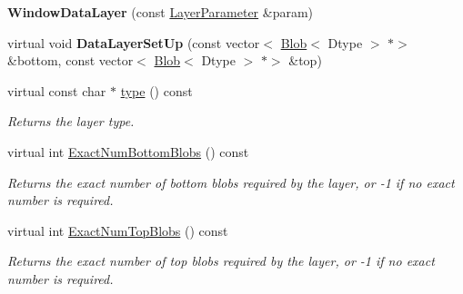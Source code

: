 \begin{DoxyCompactItemize}
{\bfseries Window\+Data\+Layer} (const \mbox{\hyperlink{classcaffe_1_1_layer_parameter}{Layer\+Parameter}} \&param)
\item 
\mbox{\label{classcaffe_1_1_window_data_layer_a217f2006728530d6c53d273c6ea0c0c0}} 
virtual void {\bfseries Data\+Layer\+Set\+Up} (const vector$<$ \mbox{\hyperlink{classcaffe_1_1_blob}{Blob}}$<$ Dtype $>$ $\ast$$>$ \&bottom, const vector$<$ \mbox{\hyperlink{classcaffe_1_1_blob}{Blob}}$<$ Dtype $>$ $\ast$$>$ \&top)
\item 
\mbox{\label{classcaffe_1_1_window_data_layer_abbe9d7bd1141bf0492eeca4bb1d7b7c3}} 
virtual const char $\ast$ \mbox{\hyperlink{classcaffe_1_1_window_data_layer_abbe9d7bd1141bf0492eeca4bb1d7b7c3}{type}} () const
\begin{DoxyCompactList}\small\item\em Returns the layer type. \end{DoxyCompactList}\item 
virtual int \mbox{\hyperlink{classcaffe_1_1_window_data_layer_ac982c8170a7f899366321412a7bb91d7}{Exact\+Num\+Bottom\+Blobs}} () const
\begin{DoxyCompactList}\small\item\em Returns the exact number of bottom blobs required by the layer, or -\/1 if no exact number is required. \end{DoxyCompactList}\item 
virtual int \mbox{\hyperlink{classcaffe_1_1_window_data_layer_a7bd9264758f462b3392d2eedec8b1c99}{Exact\+Num\+Top\+Blobs}} () const
\begin{DoxyCompactList}\small\item\em Returns the exact number of top blobs required by the layer, or -\/1 if no exact number is required. \end{DoxyCompactList}\end{DoxyCompactItemize}

